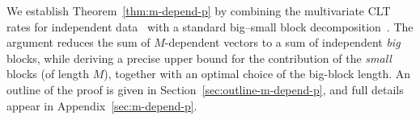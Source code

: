 \documentclass[mnsc,nonblindrev]{informs3}
\begin{document}
We establish Theorem~\ref{thm:m-depend-p} by combining the multivariate CLT rates for
independent data~\citep{bonis2020stein} with a standard big–small block decomposition~\cite[Equation 17.36]{Meyn12_book}. The argument reduces the sum of
$M$-dependent vectors to a sum of independent \emph{big} blocks, while deriving a
precise upper bound for the contribution of the \emph{small} blocks (of length $M$),
together with an optimal choice of the big-block length. An outline of the proof is
given in Section~\ref{sec:outline-m-depend-p}, and full details appear in
Appendix~\ref{sec:m-depend-p}.

\end{document}
